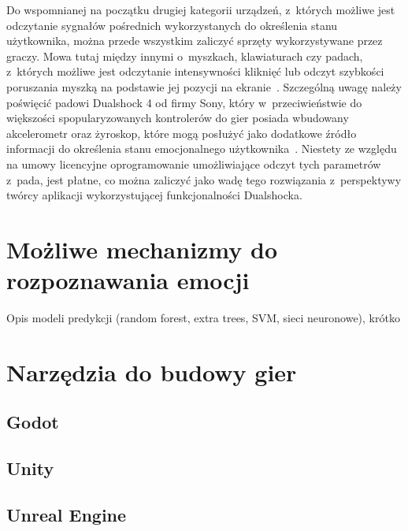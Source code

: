 Do wspomnianej na początku drugiej kategorii urządzeń, z~których możliwe jest odczytanie sygnałów pośrednich wykorzystanych do określenia stanu użytkownika, można przede wszystkim zaliczyć sprzęty wykorzystywane przez graczy. Mowa tutaj między innymi o~myszkach, klawiaturach czy padach, z~których możliwe jest odczytanie intensywności kliknięć lub odczyt szybkości poruszania myszką na podstawie jej pozycji na ekranie~\cite{measuring_emotion_from_gamepad}. Szczególną uwagę należy poświęcić padowi Dualshock 4 od firmy Sony, który w~przeciwieństwie do większości spopularyzowanych kontrolerów do gier posiada wbudowany akcelerometr oraz żyroskop, które mogą posłużyć jako dodatkowe źródło informacji do określenia stanu emocjonalnego użytkownika~\cite{dualshock_specification}. Niestety ze względu na umowy licencyjne oprogramowanie umożliwiające odczyt tych parametrów z~pada, jest płatne, co można zaliczyć jako wadę tego rozwiązania z~perspektywy twórcy aplikacji wykorzystującej funkcjonalności Dualshocka.

\section{Możliwe mechanizmy do rozpoznawania emocji}
Opis modeli predykcji (random forest, extra trees, SVM, sieci neuronowe), krótko
\section{Narzędzia do budowy gier}
\subsection{Godot}
\subsection{Unity}
\subsection{Unreal Engine}